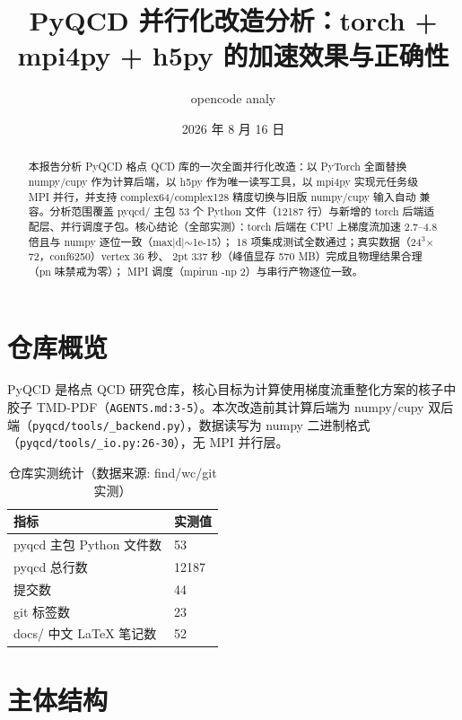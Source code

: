 \documentclass[UTF8]{ctexart}
\title{PyQCD 并行化改造分析：torch + mpi4py + h5py 的加速效果与正确性}
\author{opencode analy}
\date{2026 年 8 月 16 日}
\begin{document}
\maketitle

\begin{abstract}
本报告分析 PyQCD 格点 QCD 库的一次全面并行化改造：以 PyTorch 全面替换
numpy/cupy 作为计算后端，以 h5py 作为唯一读写工具，以 mpi4py 实现元任务级
MPI 并行，并支持 complex64/complex128 精度切换与旧版 numpy/cupy 输入自动
兼容。分析范围覆盖 pyqcd/ 主包 53 个 Python 文件（12187 行）与新增的
torch 后端适配层、并行调度子包。核心结论（全部实测）：torch 后端在
CPU 上梯度流加速 2.7--4.8 倍且与 numpy 逐位一致（max|d|$\sim$1e-15）；
18 项集成测试全数通过；真实数据（24$^3$$\times$72，conf6250）vertex 36 秒、
2pt 337 秒（峰值显存 570 MB）完成且物理结果合理（pn 味禁戒为零）；
MPI 调度（mpirun -np 2）与串行产物逐位一致。
\end{abstract}

\tableofcontents

\section{仓库概览}

PyQCD 是格点 QCD 研究仓库，核心目标为计算使用梯度流重整化方案的核子中
胶子 TMD-PDF（\texttt{\nolinkurl{AGENTS.md:3-5}}）。本次改造前其计算后端为
numpy/cupy 双后端（\texttt{\nolinkurl{pyqcd/tools/_backend.py}}），数据读写为 numpy
二进制格式（\texttt{\nolinkurl{pyqcd/tools/_io.py:26-30}}），无 MPI 并行层。

\begin{table}[htbp]\centering
\begin{tabular}{ll}
\toprule
指标 & 实测值 \\
\midrule
pyqcd 主包 Python 文件数 & 53 \\
pyqcd 总行数 & 12187 \\
提交数 & 44 \\
git 标签数 & 23 \\
docs/ 中文 LaTeX 笔记数 & 52 \\
\bottomrule
\end{tabular}
\caption{仓库实测统计（数据来源: find/wc/git 实测）}
\end{table}

\section{主体结构}
\end{document}
